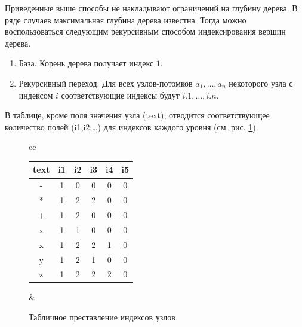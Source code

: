 Приведенные выше способы не накладывают ограничений на глубину дерева. В ряде случаев максимальная глубина дерева известна. Тогда можно воспользоваться следующим рекурсивным способом индексирования вершин дерева.
\begin{enumerate}
    \item База. Корень дерева получает индекс $1$.
    \item Рекурсивный переход. Для всех узлов-потомков $a_1,\ldots,a_n$ некоторого узла с индексом $i$ соответствующие индексы будут $i.1,\ldots,i.n$.
\end{enumerate}

В таблице, кроме поля значения узла (text), отводится соответствующее количество полей (i1,i2,\ldots) для индексов каждого уровня (см. рис. \ref{fig:rec:treeRepConstLevel}).

\begin{figure}
    \centering
    \begin{tabular}{cc}
        \begin{tabular}{|c|c|c|c|c|c|}
            \hline\hline
            text    &i1     &i2     &i3     &i4     &i5 \\
            \hline\hline
            -       &1      &0      &0      &0      &0 \\ \hline
            *       &1      &2      &2      &0      &0 \\ \hline
            +       &1      &2      &0      &0      &0 \\ \hline
            x       &1      &1      &0      &0      &0 \\ \hline
            x       &1      &2      &2      &1      &0 \\ \hline
            y       &1      &2      &1      &0      &0 \\ \hline
            z       &1      &2      &2      &2      &0 \\ \hline
        \end{tabular}
        &
    \end{tabular}
    \caption{Табличное преставление индексов узлов}
    \label{fig:rec:treeRepConstLevel}
\end{figure}

